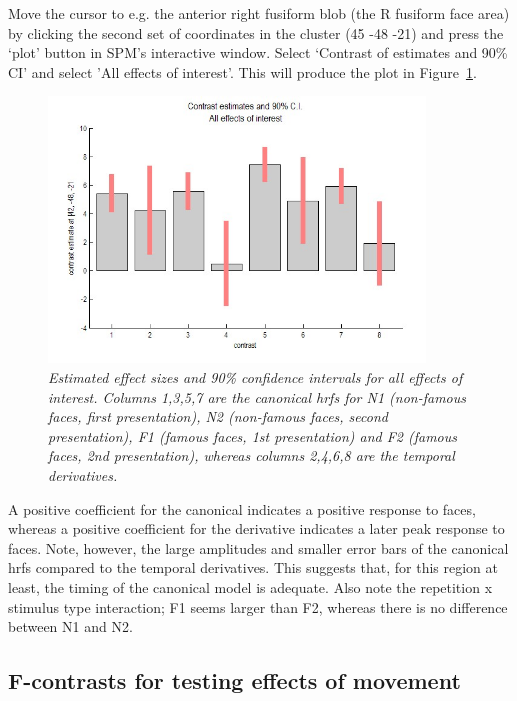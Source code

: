 \documentclass[a4paper,titlepage]{book}
\begin{document}
Move the cursor to e.g. the anterior right fusiform blob (the R fusiform face area) by clicking the second set of coordinates in the cluster (45 -48 -21) and press the `plot' button in SPM's interactive window. Select `Contrast of estimates and 90\% CI' and select 'All effects of interest'. This will produce the plot in 
Figure~\ref{con_all_plot}.
\begin{figure}
\begin{center}
\includegraphics[width=100mm]{con_all_plot}
\caption{\em Estimated effect sizes and 90\% confidence intervals for all effects of interest. Columns 1,3,5,7 are the canonical hrfs for N1 (non-famous faces, first presentation), N2 (non-famous faces, second presentation), F1 (famous faces, 1st presentation) and F2 (famous faces, 2nd presentation), whereas columns 2,4,6,8 are the temporal derivatives. \label{con_all_plot} }
\end{center}
\end{figure}
A positive coefficient for the canonical indicates a 
positive response to faces, whereas a positive coefficient for the derivative indicates a later peak 
response to faces. 
 Note, however, the large amplitudes and smaller error bars of the canonical hrfs compared to the temporal derivatives. This suggests that, for this region at least, the timing of the canonical model is adequate. Also note the repetition x stimulus type interaction; F1 seems larger than F2, whereas there is no 
 difference between N1 and N2. 


\subsection{F-contrasts for testing effects of movement}
\end{document}
